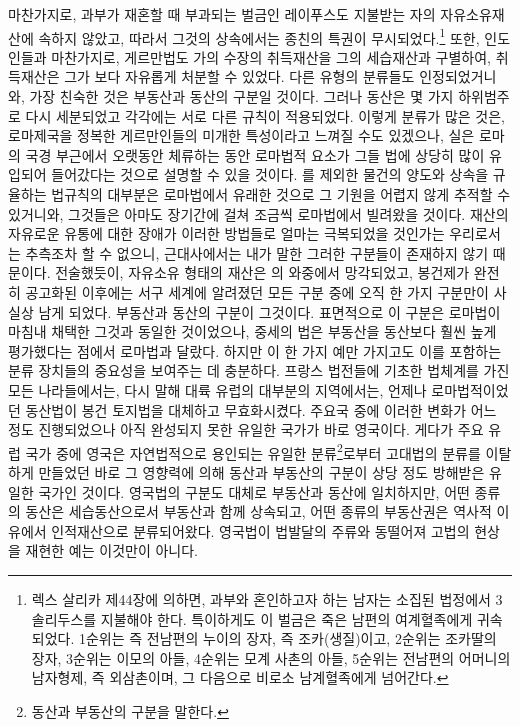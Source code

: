 마찬가지로,
과부가 재혼할 때 부과되는 벌금인
레이푸스도
지불받는 자의 자유소유재산에 속하지 않았고,
따라서 그것의 상속에서는 종친의 특권이 무시되었다.\footnote{%
  렉스 살리카 제44장에 의하면, 과부와 혼인하고자 하는 남자는
  소집된 법정에서 3솔리두스를 지불해야 한다. 특이하게도
  이 벌금은 죽은 남편의 여계혈족에게 귀속되었다.
  1순위는 즉 전남편의 누이의 장자, 즉 조카(생질)이고,
  2순위는 조카딸의 장자,
  3순위는 이모의 아들,
  4순위는 모계 사촌의 아들,
  5순위는 전남편의 어머니의 남자형제, 즉 외삼촌이며,
  그 다음으로 비로소 남계혈족에게 넘어간다. }
또한, 인도인들과 마찬가지로,
게르만법도
가의 수장의 취득재산을 그의 세습재산과 구별하여,
취득재산은 그가 보다 자유롭게 처분할 수 있었다.
다른 유형의 분류들도 인정되었거니와,
가장 친숙한 것은 부동산과 동산의 구분일 것이다.
그러나 동산은 몇 가지 하위범주로 다시 세분되었고
각각에는 서로 다른 규칙이 적용되었다.
이렇게 분류가 많은 것은,
로마제국을 정복한 게르만인들의 미개한 특성이라고 느껴질 수도 있겠으나,
실은
로마의 국경 부근에서 오랫동안 체류하는 동안
로마법적 요소가 그들 법에 상당히 많이 유입되어 들어갔다는 것으로
설명할 수 있을 것이다.
를 제외한 물건의 양도와 상속을 규율하는 법규칙의 대부분은
로마법에서 유래한 것으로 그 기원을 어렵지 않게 추적할 수 있거니와,
그것들은 아마도 장기간에 걸쳐
조금씩 로마법에서 빌려왔을 것이다.
재산의 자유로운 유통에 대한 장애가
이러한 방법들로
얼마는 극복되었을 것인가는 우리로서는 추측조차 할 수 없으니,
근대사에서는 내가 말한 그러한 구분들이 존재하지 않기 때문이다.
전술했듯이,
자유소유 형태의 재산은 의 와중에서 망각되었고,
봉건제가 완전히 공고화된 이후에는
서구 세계에 알려졌던 모든 구분 중에 오직 한 가지 구분만이
사실상 남게 되었다.
부동산과 동산의 구분이 그것이다.
표면적으로 이 구분은 로마법이 마침내 채택한 그것과 동일한 것이었으나,
중세의 법은 부동산을 동산보다 훨씬 높게 평가했다는 점에서
로마법과 달랐다.
하지만 이 한 가지 예만 가지고도
이를 포함하는 분류 장치들의 중요성을 보여주는 데 충분하다.
프랑스 법전들에 기초한 법체계를 가진 모든 나라들에서는,
다시 말해 대륙 유럽의 대부분의 지역에서는,
언제나 로마법적이었던 동산법이 봉건 토지법을 대체하고 무효화시켰다.
주요국 중에
이러한 변화가 어느 정도 진행되었으나 아직 완성되지 못한
유일한 국가가 바로 영국이다.
게다가 주요 유럽 국가 중에 영국은
자연법적으로 용인되는 유일한
분류\footnote{%
  동산과 부동산의 구분을 말한다.
}로부터
고대법의 분류를 이탈하게 만들었던
바로 그 영향력에 의해
동산과 부동산의 구분이
상당 정도 방해받은
유일한 국가인 것이다.
영국법의 구분도 대체로 부동산과 동산에 일치하지만,
어떤 종류의 동산은 세습동산으로서 부동산과 함께 상속되고,
어떤 종류의 부동산권은 역사적 이유에서 인적재산으로 분류되어왔다.
영국법이
법발달의 주류와 동떨어져
고법의 현상을 재현한 예는 이것만이 아니다.


